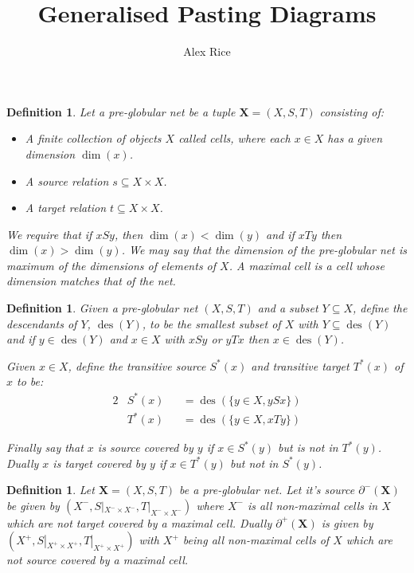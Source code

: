 \documentclass[draft]{article}
\title{Generalised Pasting Diagrams} \author{Alex Rice}
\newtheorem{definition}[theorem]{Definition} \theoremstyle{remark}
\DeclareMathOperator{\des}{des}
\newcommand*{\X}{\ensuremath{\mathbf{X}}}
\begin{document}
\maketitle

\begin{definition}
  Let a \emph{pre-globular net} be a tuple \(\X = (X,S,T)\) consisting of:
  \begin{itemize}
  \item A finite collection of objects \(X\) called cells, where each \(x \in X\) has a given dimension \(\dim(x)\).
  \item A source relation \(s \subseteq X \times X\).
  \item A target relation \(t \subseteq X \times X\).
  \end{itemize}
  We require that if \(xSy\), then \(\dim(x) < \dim(y)\) and if \(xTy\) then \(\dim(x) > \dim(y)\). We may say that the dimension of the pre-globular net is maximum of the dimensions of elements of \(X\). A maximal cell is a cell whose dimension matches that of the net.
\end{definition}

\begin{definition}
  Given a pre-globular net \((X,S,T)\) and a subset \(Y \subseteq X\), define the \emph{descendants} of \(Y\), \(\des(Y)\), to be the smallest subset of \(X\) with \(Y \subseteq \des(Y)\) and if \(y \in \des(Y)\) and \(x \in X\) with \(x S y\) or \(y T x\) then \(x \in \des(Y)\).

  Given \(x \in X\), define the \emph{transitive source} \(S^*(x)\) and \emph{transitive target} \(T^*(x)\) of \(x\) to be:
  \begin{alignat*}{2}
    &S^*(x) &&= \des(\{y \in X, ySx\})\\
    &T^*(x) &&= \des(\{y \in X, xTy\})
  \end{alignat*}

  Finally say that \(x\) is \emph{source covered} by \(y\) if \(x \in S^*(y)\) but is not in \(T^*(y)\). Dually \(x\) is \emph{target covered} by \(y\) if \(x \in T^*(y)\) but not in \(S^*(y)\).
\end{definition}

\begin{definition}
  Let \(\X = (X,S,T)\) be a pre-globular net. Let it's source \(\partial^-(\X)\) be given by \((X^-,S|_{X^-\times X^-},T|_{X^-\times X^-})\) where \(X^-\) is all non-maximal cells in \(X\) which are not target covered by a maximal cell. Dually \(\partial^+(\X)\) is given by \((X^+,S|_{X^+\times X^+},T|_{X^+\times X^+})\) with \(X^+\) being all non-maximal cells of \(X\) which are not source covered by a maximal cell.
\end{definition}
\end{document}
